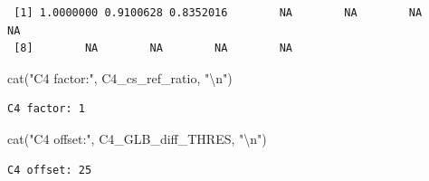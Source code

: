 \documentclass[
  10pt,
  a4paper,oneside]{article}
\newenvironment{Shaded}{\begin{snugshade}}{\end{snugshade}}
\newcommand{\FunctionTok}[1]{\textcolor[rgb]{0.00,0.00,0.00}{#1}}
\newcommand{\NormalTok}[1]{#1}
\newcommand{\SpecialCharTok}[1]{\textcolor[rgb]{0.00,0.00,0.00}{#1}}
\newcommand{\StringTok}[1]{\textcolor[rgb]{0.31,0.60,0.02}{#1}}
\begin{document}
\begin{verbatim}
 [1] 1.0000000 0.9100628 0.8352016        NA        NA        NA        NA
 [8]        NA        NA        NA        NA
\end{verbatim}

\begin{Shaded}
\begin{Highlighting}[]
\FunctionTok{cat}\NormalTok{(}\StringTok{"C4 factor:"}\NormalTok{, C4\_cs\_ref\_ratio,   }\StringTok{"}\SpecialCharTok{\textbackslash{}n}\StringTok{"}\NormalTok{)}
\end{Highlighting}
\end{Shaded}

\begin{verbatim}
C4 factor: 1 
\end{verbatim}

\begin{Shaded}
\begin{Highlighting}[]
\FunctionTok{cat}\NormalTok{(}\StringTok{"C4 offset:"}\NormalTok{, C4\_GLB\_diff\_THRES, }\StringTok{"}\SpecialCharTok{\textbackslash{}n}\StringTok{"}\NormalTok{)}
\end{Highlighting}
\end{Shaded}

\begin{verbatim}
C4 offset: 25 
\end{verbatim}
\end{document}
